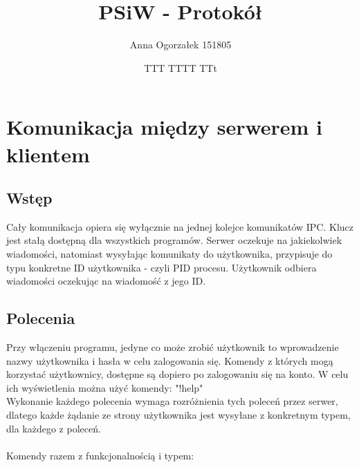 \documentclass[11pt]{article}
\title{PSiW - Protokół}
\author{Anna Ogorzałek 151805 \and TTT TTTT TTt}
\date{}
\begin{document}
	\maketitle
	\section{Komunikacja między serwerem i klientem}
	\subsection{Wstęp}
	Cały komunikacja opiera się wyłącznie na jednej kolejce komunikatów IPC. Klucz jest stałą dostępną dla wszystkich programów. Serwer oczekuje na jakiekolwiek wiadomości, natomiast wysyłając komunikaty do użytkownika, przypisuje do typu konkretne ID użytkownika - czyli PID procesu. Użytkownik odbiera wiadomości oczekując na wiadomość z jego ID.
	\subsection{Polecenia}
	Przy włączeniu programu, jedyne co może zrobić użytkownik to wprowadzenie nazwy użytkownika i hasła w celu zalogowania się. Komendy z których mogą korzystać użytkownicy, dostępne są dopiero po zalogowaniu się na konto. W celu ich wyświetlenia można użyć komendy: "!help"\\
	Wykonanie każdego polecenia wymaga rozróżnienia tych poleceń przez serwer, dlatego każde żądanie ze strony użytkownika jest wysyłane z konkretnym typem, dla każdego z poleceń.\\\\ Komendy razem z funkcjonalnością i typem:
	
\end{document}
